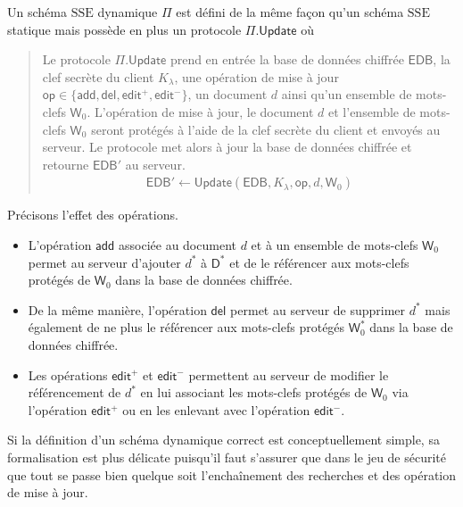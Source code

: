 \begin{defi}
Un schéma $\mathrm{SSE}$ dynamique $\mathsf{\Pi}$ est défini de la même façon
qu'un schéma $\mathrm{SSE}$ statique mais possède en plus un protocole
$\mathsf{\Pi}.\mathsf{Update}$ où
\begin{quote}
Le protocole $\mathsf{\Pi}.\mathsf{Update}$ prend en entrée la base de données
chiffrée $\mathsf{EDB}$, la clef secrète du client $K_\lambda$, une opération de
mise à jour $\mathsf{op} \in \{\mathsf{add},\mathsf{del},\mathsf{edit^+},
\mathsf{edit^-}\}$, un document $d$ ainsi qu'un ensemble de mots-clefs
$\mathsf{W}_0$. L'opération de mise à jour, le document $d$ et l'ensemble de
mots-clefs $\mathsf{W}_0$ seront protégés à l'aide de la clef secrète du client
et envoyés au serveur. Le protocole met alors à jour la base de données chiffrée
et retourne $\mathsf{EDB'}$ au serveur.
\begin{align*}
\mathsf{EDB'} \leftarrow
\mathsf{Update}(\mathsf{EDB},K_\lambda,\mathsf{op},d,\mathsf{W}_0)
\end{align*}
\end{quote}
\end{defi}

Précisons l'effet des opérations.
\begin{itemize}
\item L'opération $\mathsf{add}$ associée au document $d$ et à un ensemble de
mots-clefs $\mathsf{W}_0$ permet au serveur d'ajouter $d^*$ à $\mathsf{D}^*$ et
de le référencer aux mots-clefs protégés de $\mathsf{W}_0$ dans la base de
données chiffrée.
\item De la même manière, l'opération $\mathsf{del}$ permet au serveur de
supprimer $d^*$ mais également de ne plus le référencer aux mots-clefs protégés
$\mathsf{W}_0^*$ dans la base de données chiffrée.
\item Les opérations $\mathsf{edit^+}$ et $\mathsf{edit^-}$ permettent au
serveur de modifier le référencement de $d^*$ en lui associant les mots-clefs
protégés de $\mathsf{W}_0$ via l'opération $\mathsf{edit^+}$ ou en les enlevant
avec l'opération $\mathsf{edit^-}$.
\end{itemize}

\begin{remark}
Si la définition d'un schéma dynamique correct est conceptuellement simple, sa
formalisation est plus délicate puisqu'il faut s'assurer que dans le jeu de
sécurité que tout se passe bien quelque soit l'enchaînement des recherches et
des opération de mise à jour.
\end{remark}
